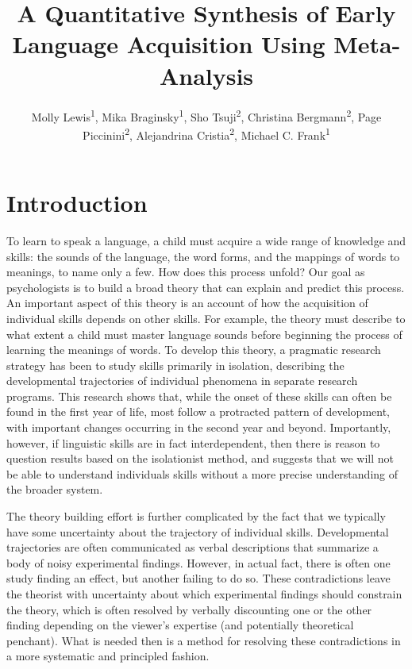 \documentclass[english,floatsintext,man]{apa6}
\title{A Quantitative Synthesis of Early Language Acquisition Using
Meta-Analysis}
\author{
          Molly Lewis\textsuperscript{1},
          Mika Braginsky\textsuperscript{1},
          Sho Tsuji\textsuperscript{2},
          Christina Bergmann\textsuperscript{2},
          Page Piccinini\textsuperscript{2},
          Alejandrina Cristia\textsuperscript{2},
          Michael C. Frank\textsuperscript{1}  }
\affiliation{
    \vspace{0.5cm}
          \textsuperscript{1} Department of Psychology, Stanford University\\
          \textsuperscript{2} Laboratoire de Sciences Cognitives et Psycholinguistique, ENS  }
\begin{document}
\maketitle



\section{Introduction}\label{introduction}

To learn to speak a language, a child must acquire a wide range of
knowledge and skills: the sounds of the language, the word forms, and
the mappings of words to meanings, to name only a few. How does this
process unfold? Our goal as psychologists is to build a broad theory
that can explain and predict this process. An important aspect of this
theory is an account of how the acquisition of individual skills depends
on other skills. For example, the theory must describe to what extent a
child must master language sounds before beginning the process of
learning the meanings of words. To develop this theory, a pragmatic
research strategy has been to study skills primarily in isolation,
describing the developmental trajectories of individual phenomena in
separate research programs. This research shows that, while the onset of
these skills can often be found in the first year of life, most follow a
protracted pattern of development, with important changes occurring in
the second year and beyond. Importantly, however, if linguistic skills
are in fact interdependent, then there is reason to question results
based on the isolationist method, and suggests that we will not be able
to understand individuals skills without a more precise understanding of
the broader system.

The theory building effort is further complicated by the fact that we
typically have some uncertainty about the trajectory of individual
skills. Developmental trajectories are often communicated as verbal
descriptions that summarize a body of noisy experimental findings.
However, in actual fact, there is often one study finding an effect, but
another failing to do so. These contradictions leave the theorist with
uncertainty about which experimental findings should constrain the
theory, which is often resolved by verbally discounting one or the other
finding depending on the viewer's expertise (and potentially theoretical
penchant). What is needed then is a method for resolving these
contradictions in a more systematic and principled fashion.
\end{document}

